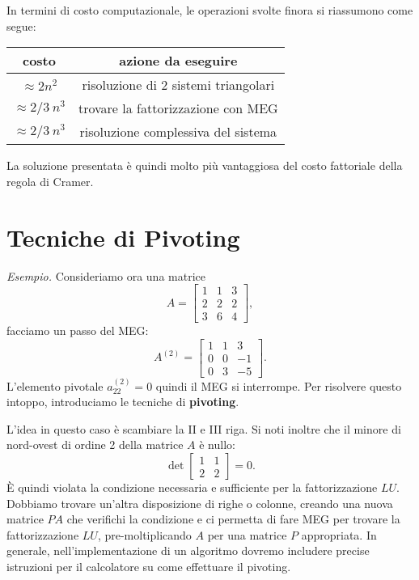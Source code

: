 In termini di costo computazionale, le operazioni svolte finora si riassumono come segue:
\begin{center}
\begin{tabular}{cc}
\toprule
 costo & azione da eseguire \\
\midrule
 $\approx 2n^{2}$ & risoluzione di $2$ sistemi triangolari \\
$\approx 2/3 \ n^{3}$ & trovare la fattorizzazione con MEG \\
\hline
$\approx 2/3 \ n^{3}$ & risoluzione complessiva del sistema \\
 \bottomrule
\end{tabular}

\end{center}
La soluzione presentata è quindi molto più vantaggiosa del costo fattoriale della regola di Cramer.

\section{Tecniche di Pivoting}

\textit{Esempio.}
Consideriamo ora una matrice
\begin{equation*}
A=\begin{bmatrix}
1 & 1 & 3\\
2 & 2 & 2\\
3 & 6 & 4
\end{bmatrix},
\end{equation*}
facciamo un passo del MEG:
\begin{equation*}
A^{(2)} =\begin{bmatrix}
1 & 1 & 3\\
0 & 0 & -1\\
0 & 3 & -5
\end{bmatrix}.
\end{equation*}
L'elemento pivotale $\displaystyle a^{(2)}_{22} =0$ quindi il MEG si interrompe.
Per risolvere questo intoppo, introduciamo le tecniche di \textbf{pivoting}.

L'idea in questo caso è scambiare la II e III riga.
Si noti inoltre che il minore di nord-ovest di ordine 2 della matrice $A$ è nullo:
\begin{equation*}
\operatorname{det}\begin{bmatrix}
1 & 1 \\
2 & 2
\end{bmatrix} = 0.
\end{equation*}
È quindi violata la condizione necessaria e sufficiente per la fattorizzazione $LU$. Dobbiamo trovare un'altra disposizione di righe o colonne, creando una nuova matrice $PA$ che verifichi la condizione e ci permetta di fare MEG per trovare la fattorizzazione $LU$, pre-moltiplicando $A$ per una matrice $P$ appropriata.
In generale, nell'implementazione di un algoritmo dovremo includere precise istruzioni per il calcolatore su come effettuare il pivoting.


